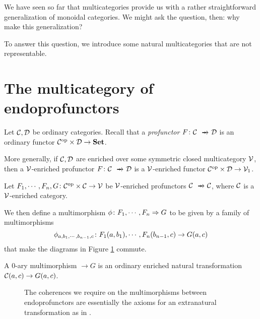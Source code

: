 \documentclass{report}[11pt]
\begin{document}
We have seen so far that multicategories provide us with a rather straightforward generalization of monoidal categories.  
We might ask the question, then: why make this generalization? 

To answer this question, we introduce some natural multicategories that are not representable.

\section{The multicategory of endoprofunctors}
\label{SecEndoprofunctors}

Let ${\mathcal{C}},{\mathcal{D}}$ be ordinary categories.  
Recall that a \emph{profunctor} $F \from \C \pto \D$ is an ordinary functor ${\mathcal{C}}^{\mathrm{op}} \times {\mathcal{D}}\to{\normalfont\textbf{Set}}$.

More generally, if ${\mathcal{C}},{\mathcal{D}}$ are enriched over some symmetric closed multicategory ${\mathcal{V}}$, then a ${\mathcal{V}}$-enriched profunctor $F \from \C \pto \D$ is a ${\mathcal{V}}$-enriched functor ${\mathcal{C}}^{\mathrm{op}}\times{\mathcal{D}}\to{\mathcal{V}}_1$.

Let $F_1,\cdots,F_n,G \colon {\mathcal{C}}^{\mathrm{op}} \times {\mathcal{C}} \to {\mathcal{V}}$ be ${\mathcal{V}}$-enriched profunctors $\C\pto \C$, where ${\mathcal{C}}$ is a ${\mathcal{V}}$-enriched category.

We then define a multimorphism $\phi\colon F_1,\cdots,F_n \Rightarrow G$ to be given by a family of multimorphisms
\[
  \phi_{a,b_1,\cdots,b_{n-1},c} \colon F_1(a,b_1),\cdots,F_n(b_{n-1},c) \to G(a,c)
  \]
that make the diagrams in Figure \ref{FigExtranatural} commute.

A $0$-ary multimorphism $\to G$ is an ordinary enriched natural transformation ${\mathcal{C}}(a,c) \to G(a,c)$.
\begin{figure}
  \caption{The coherences we require on the multimorphisms between endoprofunctors are essentially the axioms for an extranatural transformation as in \cite{ExtranaturalTransformations}.}
  \label{FigExtranatural}
\end{figure}
\end{document}
